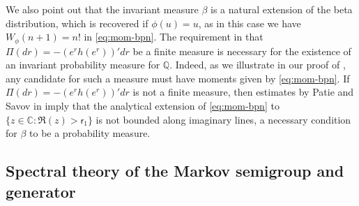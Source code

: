 \documentclass[10pt]{amsart}
\theoremstyle{plain}
\theoremstyle{definition}
\newcommand{\J}{\mathds{Q}}
\newcommand{\vat}{{\mathsf{r}_1}}
\let\bpsi\beta
\begin{document}
We also point out that the invariant measure $\bpsi$ is a natural extension of the beta distribution, which is recovered if $\phi(u) = u$, as in this case we have $W_\phi(n+1)=n!$ in \eqref{eq:mom-bpn}. The requirement in  that $\Pi(dr) = -(e^rh(e^r))'dr$ be a finite measure is necessary for the existence of an invariant probability measure for $\J$. Indeed, as we illustrate in our proof of , any candidate for such a measure must have moments given by \eqref{eq:mom-bpn}. If $\Pi(dr) = -(e^rh(e^r))'dr$ is not a finite measure, then estimates by Patie and Savov in \cite[Th.\,3.3]{Patie-Savov-Bern} imply that the analytical extension of \eqref{eq:mom-bpn} to $\{z \in \mathbb{C} : \Re(z) > \vat\}$ is not bounded along imaginary lines, a necessary condition for $\beta$ to be a probability measure.

\subsection{Spectral theory of the Markov semigroup and generator}
\end{document}
